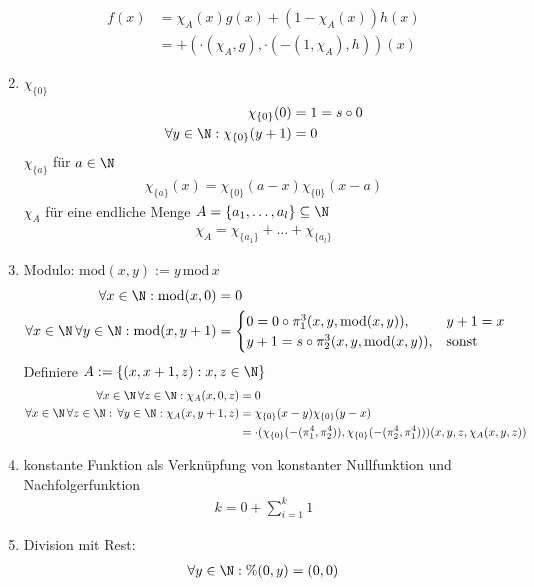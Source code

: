 \begin{solution}
\begin{enumerate}
\begin{align*}
			f(x) &= \chi_A(x) g(x) + (1 - \chi_A(x)) h(x) \\
			&= +(\cdot(\chi_A,g), \cdot(-(1,\chi_A),h))(x)
			\end{align*}
		\item $\chi_{\{0\}}$
			\begin{align*}
			\chi_{\{0\}}(0) &= 1 = s\circ 0 \\
			\forall y \in \N: \chi_{\{0\}}(y + 1) &= 0
			\end{align*}
		$\chi_{\{a\}}$ für $a \in \N$
			\begin{align*}
			\chi_{\{a\}}(x) = \chi_{\{0\}}(a - x) \chi_{\{0\}}(x - a)
			\end{align*}
		$\chi_A$ für eine endliche Menge $A = \{a_1, \dots, a_l\} \subseteq \N$
			\begin{align*}
			\chi_A = \chi_{\{a_1\}} + \dots + \chi_{\{a_l\}}
			\end{align*}
		\item
			Modulo: $\mathrm{mod}(x,y) := y\, \mathrm{mod}\, x$
			\begin{align*}
				\forall x \in \N: \mathrm{mod}(x,0) &= 0 \\
				\forall x \in \N\, \forall y \in \N: \mathrm{mod}(x,y+1) &=
				\begin{cases}
					0 = 0\circ \pi_1^3(x,y,\mathrm{mod}(x,y)), & y+1 = x \\
					y+1 = s\circ\pi_2^3(x,y,\mathrm{mod}(x,y)), & \text{sonst}
				\end{cases}
			\end{align*}
			Definiere $A := \{(x,x+1,z): x,z \in \N\}$
			\begin{align*}
				\forall x \in \N\, \forall z \in \N: \chi_A(x,0,z) &= 0 \\
				\forall x \in \N\,\forall z \in \N:\, \forall y \in \N: \chi_A(x,y+1,z)
				&= \chi_{\{0\}}(x-y)\chi_{\{0\}}(y-x) \\
				&= \cdot(\chi_{\{0\}}(-(\pi_1^4,\pi_2^4)),\chi_{\{0\}}(-(\pi_2^4,\pi_1^4)))(x,y,z,\chi_A(x,y,z))
			\end{align*}
		\item konstante Funktion als Verknüpfung von konstanter Nullfunktion und Nachfolgerfunktion
			\begin{align*}
			k = 0 + \sum_{i = 1}^k 1
			\end{align*}
		\item Division mit Rest:
		\begin{align*}
			\forall y \in \N: \%(0,y) &= (0,0) \\

\end{align*}
\end{enumerate}
\end{solution}
